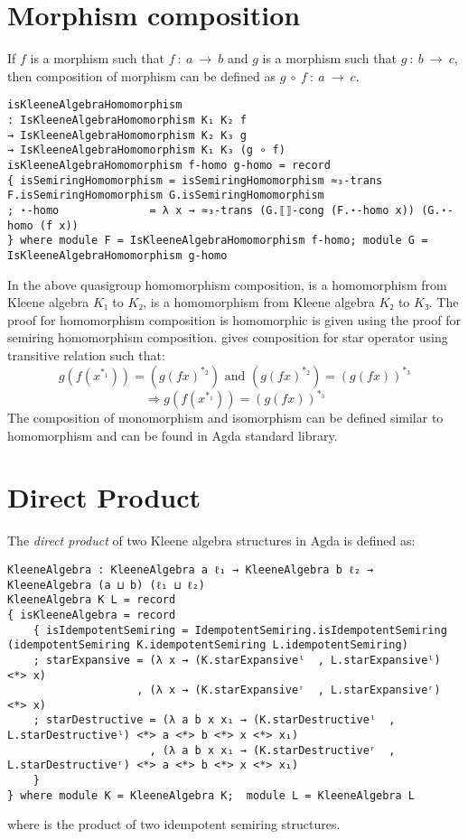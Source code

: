 \section{Morphism composition}
If $f$ is a morphism such that $f\ :\ a \ \rightarrow \ b$ and $g$ is a morphism
such that $g\ :\ b\ \rightarrow \ c$, then composition of morphism can be
defined as $g \ ∘\ f\ :\ a \ \rightarrow \ c$.
\begin{verbatim}
isKleeneAlgebraHomomorphism
: IsKleeneAlgebraHomomorphism K₁ K₂ f
→ IsKleeneAlgebraHomomorphism K₂ K₃ g
→ IsKleeneAlgebraHomomorphism K₁ K₃ (g ∘ f)
isKleeneAlgebraHomomorphism f-homo g-homo = record
{ isSemiringHomomorphism = isSemiringHomomorphism ≈₃-trans F.isSemiringHomomorphism G.isSemiringHomomorphism
; ⋆-homo              = λ x → ≈₃-trans (G.⟦⟧-cong (F.⋆-homo x)) (G.⋆-homo (f x))
} where module F = IsKleeneAlgebraHomomorphism f-homo; module G = IsKleeneAlgebraHomomorphism g-homo
\end{verbatim}
In the above quasigroup homomorphism composition,  is a homomorphism
from Kleene algebra $K₁$ to $K₂$,  is a homomorphism from Kleene
algebra $K₂$ to $K₃$. The proof for homomorphism composition is homomorphic is
given using the proof for semiring homomorphism composition. 
gives composition for star operator using transitive relation such that: 
\[g (f (x^{*_1})) = (g (f x) ^{*_2}) \text{ and } (g (f x) ^{*_2}) = (g (f x))^{*_3}\] 
\[\Rightarrow g (f (x^{*_1})) = (g (f x))^{*_3}\] The composition of
monomorphism and isomorphism can be defined similar to homomorphism and can be
found in Agda standard library.

\section{Direct Product}
The \textit{direct product} of two Kleene algebra structures in Agda is defined
as:
\begin{verbatim}
KleeneAlgebra : KleeneAlgebra a ℓ₁ → KleeneAlgebra b ℓ₂ → KleeneAlgebra (a ⊔ b) (ℓ₁ ⊔ ℓ₂)
KleeneAlgebra K L = record
{ isKleeneAlgebra = record
    { isIdempotentSemiring = IdempotentSemiring.isIdempotentSemiring (idempotentSemiring K.idempotentSemiring L.idempotentSemiring)
    ; starExpansive = (λ x → (K.starExpansiveˡ  , L.starExpansiveˡ) <*> x)
                    , (λ x → (K.starExpansiveʳ  , L.starExpansiveʳ) <*> x)
    ; starDestructive = (λ a b x x₁ → (K.starDestructiveˡ  , L.starDestructiveˡ) <*> a <*> b <*> x <*> x₁)
                      , (λ a b x x₁ → (K.starDestructiveʳ  , L.starDestructiveʳ) <*> a <*> b <*> x <*> x₁)
    }
} where module K = KleeneAlgebra K;  module L = KleeneAlgebra L
\end{verbatim}
where  is the product of two idempotent semiring structures.
